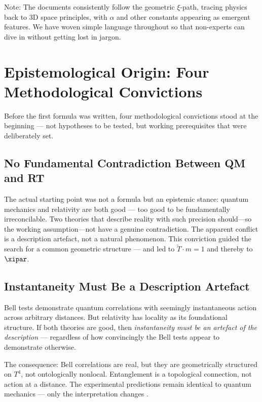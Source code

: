 	Note: The documents consistently follow the geometric $\xi$-path, tracing physics back to 3D space principles, with $\alpha$ and other constants appearing as emergent features. We have woven simple language throughout so that non-experts can dive in without getting lost in jargon.
	
	\section{Epistemological Origin: Four Methodological Convictions}

Before the first formula was written, four methodological convictions stood at the beginning --- not hypotheses to be tested, but working prerequisites that were deliberately set.

\subsection{No Fundamental Contradiction Between QM and RT}

The actual starting point was not a formula but an epistemic stance: quantum mechanics and relativity are both good --- too good to be fundamentally irreconcilable. Two theories that describe reality with such precision should—so the working assumption—not have a genuine contradiction. The apparent conflict is a description artefact, not a natural phenomenon. This conviction guided the search for a common geometric structure --- and led to $\tilde{T} \cdot m = 1$ and thereby to $\xipar$.

\subsection{Instantaneity Must Be a Description Artefact}

Bell tests demonstrate quantum correlations with seemingly instantaneous action across arbitrary distances. But relativity has locality as its foundational structure. If both theories are good, then \emph{instantaneity must be an artefact of the description} --- regardless of how convincingly the Bell tests appear to demonstrate otherwise.

The consequence: Bell correlations are real, but they are geometrically structured on $T^4$, not ontologically nonlocal. Entanglement is a topological connection, not action at a distance. The experimental predictions remain identical to quantum mechanics --- only the interpretation changes \cite{Hilbertraum2026}.

